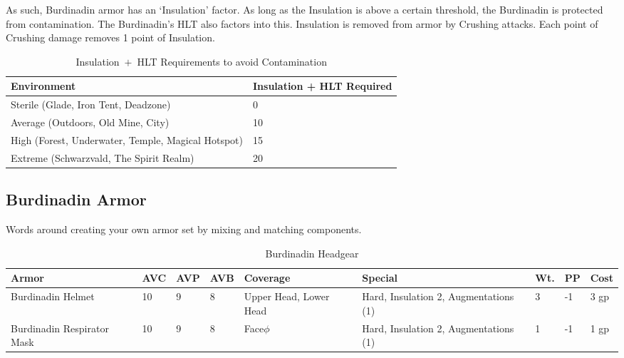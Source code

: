 \documentclass[oneside,11pt,english]{book}
\begin{document}
As such, Burdinadin armor has an ‘Insulation’ factor. As long as the Insulation is above a certain threshold, the Burdinadin is protected from contamination. The Burdinadin’s HLT also factors into this. 
Insulation is removed from armor by Crushing attacks. Each point of Crushing damage removes 1 point of Insulation. 

\begin{table}
	\centering
	\caption{Insulation~$+$~HLT Requirements to avoid Contamination}
	\label{tab:Insulation Requirements}
	\begin{tabu} spread 0pt {XX[-1]}
Environment&Insulation + HLT Required\\\toprule
Sterile (Glade, Iron Tent, Deadzone)&0\\
Average (Outdoors, Old Mine, City)&10\\
High (Forest, Underwater, Temple, Magical Hotspot)&15 \\
Extreme (Schwarzvald, The Spirit Realm)& 20\\
	\end{tabu}
\end{table}
\subsection{Burdinadin Armor}
Words around creating your own armor set by mixing and matching components.

\begin{table}[!ht]
	\caption{Burdinadin Headgear}
	\label{tab:Burdinadin Headgear}
	\begin{tabu} to 
Armor &AVC &AVP &AVB &Coverage &Special &Wt. &PP &Cost\\\toprule
Burdinadin Helmet&10&9&8&Upper Head, Lower Head&Hard, Insulation 2, Augmentations (1)&3&-1&3 gp\\
Burdinadin Respirator Mask &10 &9 &8 &Face$\phi$ &Hard, Insulation 2, Augmentations (1)&1&-1&1 gp\\
	\end{tabu}
\end{table}
\end{document}
